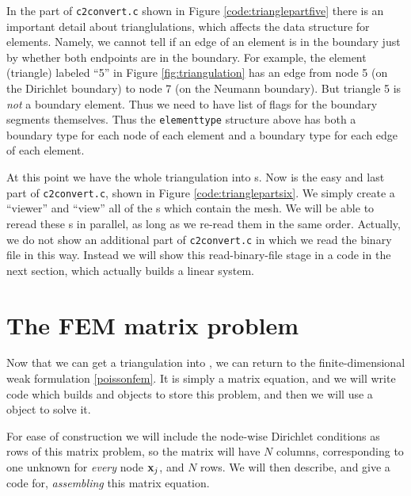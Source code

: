 
In the part of \texttt{c2convert.c} shown in Figure \ref{code:trianglepartfive} there is an important detail about trianglulations, which affects the data structure for elements.  Namely, we cannot tell if an edge of an element is in the boundary just by whether both endpoints are in the boundary.  For example, the element (triangle) labeled ``5'' in Figure \ref{fig:triangulation} has an edge from node 5 (on the Dirichlet boundary) to node 7 (on the Neumann boundary).  But triangle 5 is \emph{not} a boundary element.  Thus we need to have list of flags for the boundary segments themselves.  Thus the \texttt{elementtype} structure above has both a boundary type for each node of each element and a boundary type for each edge of each element.

At this point we have the whole triangulation into \PETSc \pVec s.  Now is the easy and last part of \texttt{c2convert.c}, shown in Figure \ref{code:trianglepartsix}.  We simply create a \PETSc ``viewer'' and ``view'' all of the \pVec s which contain the mesh.  We will be able to reread these \pVec s in parallel, as long as we re-read them in the same order.  Actually, we do not show an additional part of \texttt{c2convert.c} in which we read the binary file in this way.  Instead we will show this read-binary-file stage in a code in the next section, which actually builds a linear system.




\section{The FEM matrix problem}

Now that we can get a triangulation into \PETSc, we can return to the finite-dimensional weak formulation \eqref{poissonfem}.  It is simply a matrix equation, and we will write code which builds \PETSc \pMat and \pVec objects to store this problem, and then we will use a \PETSc \pKSP object to solve it.

For ease of construction we will include the node-wise Dirichlet conditions as rows of this matrix problem, so the matrix will have $N$ columns, corresponding to one unknown for \emph{every} node $\mathbf{x}_j$, and $N$ rows.  We will then describe, and give a code for, \emph{assembling} this matrix equation.


